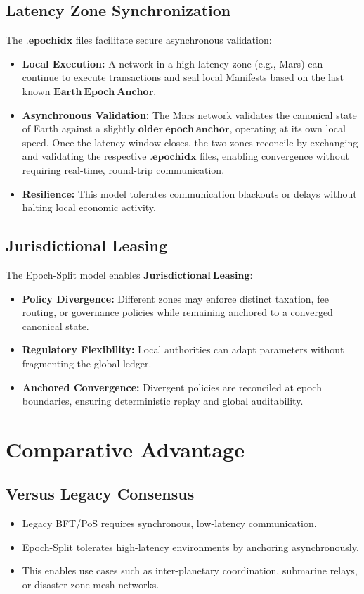\documentclass[11pt, a4paper]{article}
\begin{document}
\subsection{Latency Zone Synchronization}
The $\mathbf{.epochidx}$ files facilitate secure asynchronous validation:
\begin{itemize}
    \item \textbf{Local Execution:} A network in a high-latency zone (e.g., Mars) can continue to execute transactions and seal local Manifests based on the last known $\mathbf{Earth\ Epoch\ Anchor}$.
    \item \textbf{Asynchronous Validation:} The Mars network validates the canonical state of Earth against a slightly $\mathbf{older\ epoch\ anchor}$, operating at its own local speed. Once the latency window closes, the two zones reconcile by exchanging and validating the respective $\mathbf{.epochidx}$ files, enabling convergence without requiring real-time, round-trip communication.
    \item \textbf{Resilience:} This model tolerates communication blackouts or delays without halting local economic activity.
\end{itemize}

\subsection{Jurisdictional Leasing}
The Epoch-Split model enables $\mathbf{Jurisdictional\ Leasing}$:
\begin{itemize}
    \item \textbf{Policy Divergence:} Different zones may enforce distinct taxation, fee routing, or governance policies while remaining anchored to a converged canonical state.
    \item \textbf{Regulatory Flexibility:} Local authorities can adapt parameters without fragmenting the global ledger.
    \item \textbf{Anchored Convergence:} Divergent policies are reconciled at epoch boundaries, ensuring deterministic replay and global auditability.
\end{itemize}

\section{Comparative Advantage}
\subsection{Versus Legacy Consensus}
\begin{itemize}
    \item Legacy BFT/PoS requires synchronous, low-latency communication.
    \item Epoch-Split tolerates high-latency environments by anchoring asynchronously.
    \item This enables use cases such as inter-planetary coordination, submarine relays, or disaster-zone mesh networks.
\end{itemize}
\end{document}
